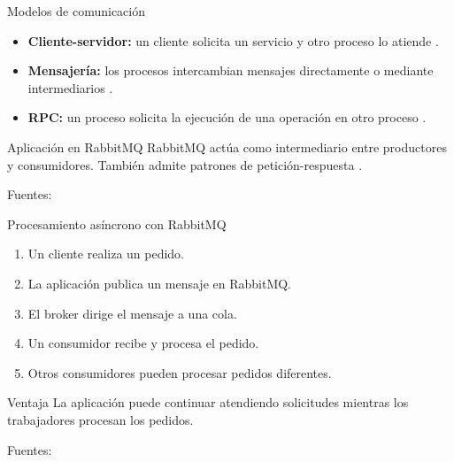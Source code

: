 \begin{frame}{Modelos de comunicación}
  \begin{itemize}
    \item \textbf{Cliente-servidor:} un cliente solicita un servicio y otro proceso lo atiende \cite{zhang2023}.
    \item \textbf{Mensajería:} los procesos intercambian mensajes directamente o mediante intermediarios \cite{maharjan2023}.
    \item \textbf{RPC:} un proceso solicita la ejecución de una operación en otro proceso \cite{zhang2023}.
  \end{itemize}

  \vspace{0.3cm}
  \begin{block}{Aplicación en RabbitMQ}
    RabbitMQ actúa como intermediario entre productores y consumidores. También admite patrones de petición-respuesta \cite{maharjan2023}.
  \end{block}

  {\tiny Fuentes: \cite{zhang2023,maharjan2023}}
\end{frame}

\begin{frame}{Procesamiento asíncrono con RabbitMQ}
  \begin{enumerate}
    \item Un cliente realiza un pedido.
    \item La aplicación publica un mensaje en RabbitMQ.
    \item El broker dirige el mensaje a una cola.
    \item Un consumidor recibe y procesa el pedido.
    \item Otros consumidores pueden procesar pedidos diferentes.
  \end{enumerate}

  \vspace{0.3cm}
  \begin{block}{Ventaja}
    La aplicación puede continuar atendiendo solicitudes mientras los trabajadores procesan los pedidos.
  \end{block}

  {\tiny Fuentes: \cite{maharjan2023,kazanavicius2023,derlatka2023}}
\end{frame}
